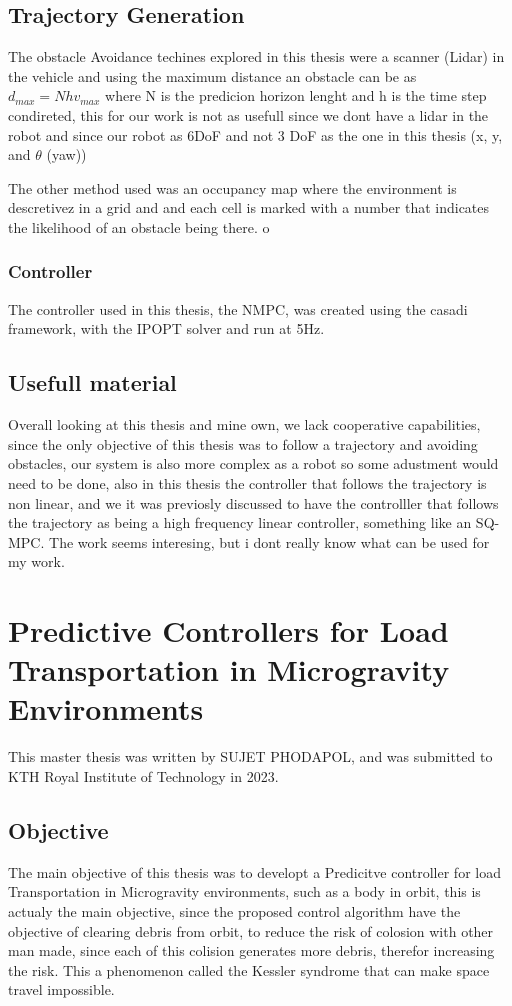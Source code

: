 \documentclass[a4paper,12pt]{article}
\begin{document}
\subsection{Trajectory Generation}
The obstacle Avoidance techines explored in this thesis were a scanner (Lidar) in the vehicle and using the maximum distance an obstacle can be as $d_{max} =  N h v_{max}$ where N is the predicion horizon lenght and h is the time step condireted, this for our work is not as usefull since we dont have a lidar in the robot and since our robot as 6DoF and not 3 DoF as the one in this thesis (x, y, and $\theta$ (yaw))

The other method used was an occupancy map where the environment is descretivez in a grid and and each cell is marked with a number that indicates the likelihood of an obstacle being there.
o

\subsubsection{Controller}
The controller used in this thesis, the NMPC, was created using the casadi framework, with the IPOPT solver and run at 5Hz.

\subsection{Usefull material}
Overall looking at this thesis and mine own, we lack cooperative capabilities, since the only objective of this thesis was to follow a trajectory and avoiding obstacles, our system is also more complex as a robot so some adustment would need to be done, also in this thesis the controller that follows the trajectory is non linear, and we it was previosly discussed to have the controlller that follows the trajectory as being a high frequency linear controller, something like an SQ-MPC. The work seems interesing, but i dont really know what can be used for my work.



\section{Predictive Controllers for Load Transportation in Microgravity Environments}
This master thesis\cite{phodapol2023predictive} was written by SUJET PHODAPOL, and was submitted to KTH Royal Institute of Technology in 2023.

\subsection{Objective}
The main objective of this thesis was to developt a Predicitve controller for load Transportation in Microgravity environments, such as a body in orbit, this is actualy the main objective, since the proposed control algorithm have the objective of clearing debris from orbit, to reduce the risk of colosion with other man made, since each of this colision generates more debris, therefor increasing the risk. This a phenomenon called the Kessler syndrome that can make space travel impossible.
\end{document}

